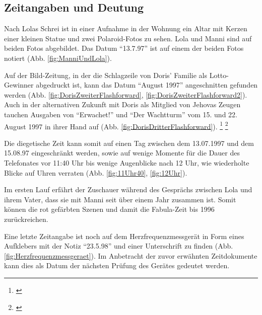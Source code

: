 
\subsection{Zeitangaben und Deutung}

Nach Lolas Schrei ist in einer Aufnahme in der Wohnung ein Altar mit Kerzen einer kleinen Statue und zwei Polaroid-Fotos zu sehen. Lola und Manni sind auf beiden Fotos abgebildet. Das Datum "`13.7.97"' ist auf einem der beiden Fotos notiert (Abb. \ref{fig:ManniUndLola}).

Auf der Bild-Zeitung, in der die Schlagzeile von Doris' Familie als Lotto-Gewinner abgedruckt ist, kann das Datum "`August 1997"' angeschnitten gefunden werden (Abb. \ref{fig:DorisZweiterFlashforward}, \ref{fig:DorisZweiterFlashforward2}). Auch in der alternativen Zukunft mit Doris als Mitglied von Jehovas Zeugen tauchen Ausgaben von "`Erwachet!"' und "`Der Wachtturm"' vom 15. und 22. August 1997 in ihrer Hand auf (Abb. \ref{fig:DorisDritterFlashforward}). \footnote{\cite{Rettung}} \footnote{\cite{DieWasserkriseEinWeltweitesProblem}} 
 
Die diegetische Zeit kann somit auf einen Tag zwischen dem 13.07.1997 und dem 15.08.97 eingeschränkt werden, sowie auf wenige Momente für die Dauer des Telefonates vor 11:40 Uhr bis wenige Augenblicke nach 12 Uhr, wie wiederholte Blicke auf Uhren verraten (Abb. \ref{fig:11Uhr40}, \ref{fig:12Uhr}).

Im ersten Lauf erfährt der Zuschauer während des Gesprächs zwischen Lola und ihrem Vater, dass sie mit Manni seit über einem Jahr zusammen ist. Somit können die rot gefärbten Szenen und damit die Fabula-Zeit bis 1996 zurückreichen.

Eine letzte Zeitangabe ist noch auf dem Herzfrequenzmessgerät in Form eines Aufklebers mit der Notiz "`23.5.98"' und einer Unterschrift zu finden (Abb. \ref{fig:Herzfrequenzmessgeraet}). Im Anbetracht der zuvor erwähnten Zeitdokumente kann dies als Datum der nächsten Prüfung des Gerätes gedeutet werden.

